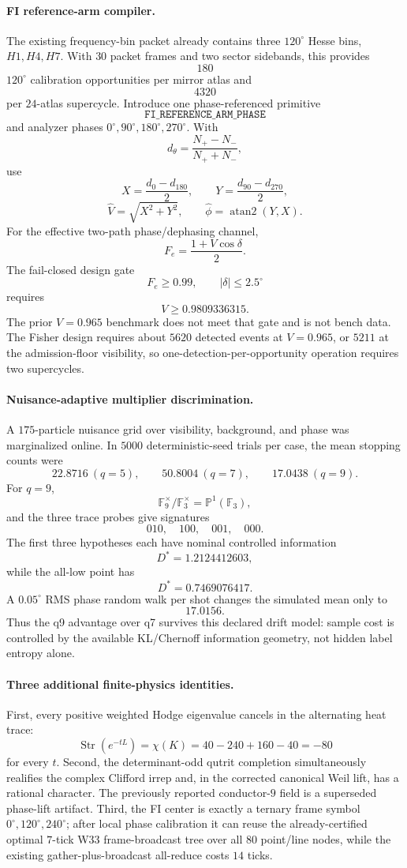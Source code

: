 \paragraph{FI reference-arm compiler.}
The existing frequency-bin packet already contains three $120^\circ$ Hesse
bins, $H1,H4,H7$.  With $30$ packet frames and two sector sidebands, this
provides
\[
\boxed{180}
\]
$120^\circ$ calibration opportunities per mirror atlas and
\[
\boxed{4320}
\]
per $24$-atlas supercycle.  Introduce one phase-referenced primitive
\[
\texttt{FI\_REFERENCE\_ARM\_PHASE}
\]
and analyzer phases $0^\circ,90^\circ,180^\circ,270^\circ$.  With
\[
d_\theta=\frac{N_+-N_-}{N_++N_-},
\]
use
\[
X=\frac{d_0-d_{180}}2,\qquad
Y=\frac{d_{90}-d_{270}}2,
\]
\[
\hat V=\sqrt{X^2+Y^2},\qquad
\hat\phi=\operatorname{atan2}(Y,X).
\]
For the effective two-path phase/dephasing channel,
\[
F_e=\frac{1+V\cos\delta}{2}.
\]
The fail-closed design gate
\[
F_e\ge0.99,\qquad |\delta|\le2.5^\circ
\]
requires
\[
\boxed{V\ge0.9809336315}.
\]
The prior $V=0.965$ benchmark does not meet that gate and is not bench data.
The Fisher design requires about $5620$ detected events at $V=0.965$, or
$5211$ at the admission-floor visibility, so one-detection-per-opportunity
operation requires two supercycles.

\paragraph{Nuisance-adaptive multiplier discrimination.}
A $175$-particle nuisance grid over visibility, background, and phase was
marginalized online.  In $5000$ deterministic-seed trials per case, the mean
stopping counts were
\[
\boxed{
22.8716\ (q=5),\qquad
50.8004\ (q=7),\qquad
17.0438\ (q=9).
}
\]
For $q=9$,
\[
\mathbb F_9^\times/\mathbb F_3^\times
=
\mathbb P^1(\mathbb F_3),
\]
and the three trace probes give signatures
\[
010,\quad100,\quad001,\quad000.
\]
The first three hypotheses each have nominal controlled information
\[
D^*=1.2124412603,
\]
while the all-low point has
\[
D^*=0.7469076417.
\]
A $0.05^\circ$ RMS phase random walk per shot changes the simulated mean only
to
\[
17.0156.
\]
Thus the q9 advantage over q7 survives this declared drift model: sample cost
is controlled by the available KL/Chernoff information geometry, not hidden
label entropy alone.

\paragraph{Three additional finite-physics identities.}
First, every positive weighted Hodge eigenvalue cancels in the alternating heat
trace:
\[
\boxed{
\operatorname{Str}(e^{-tL})
=
\chi(K)
=
40-240+160-40
=
-80
}
\]
for every $t$.  Second, the determinant-odd qutrit completion simultaneously realifies the complex Clifford irrep and, in the corrected canonical Weil lift, has a rational character. The previously reported conductor-$9$ field is a superseded phase-lift artifact.  Third, the FI center is exactly a ternary frame symbol
$0^\circ,120^\circ,240^\circ$; after local phase calibration it can reuse the
already-certified optimal $7$-tick W33 frame-broadcast tree over all $80$
point/line nodes, while the existing gather-plus-broadcast all-reduce costs
$14$ ticks.

